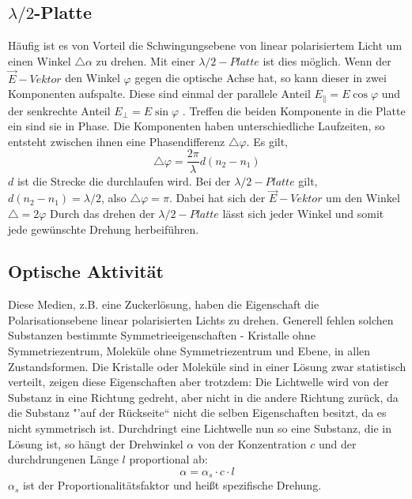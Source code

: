\subsection{$ \lambda/2 $-Platte}
Häufig ist es von Vorteil die Schwingungsebene von linear polarisiertem Licht um einen Winkel $ \bigtriangleup\alpha $ zu drehen. Mit einer $ \lambda/2-Platte $ ist dies möglich. Wenn der $ \vec{E}-Vektor $ den Winkel $ \varphi $ gegen die optische Achse hat, so kann dieser in zwei Komponenten aufspalte. Diese sind einmal der parallele Anteil $ E_{\|} = E\cos \varphi $ und der senkrechte Anteil $ E_{\bot}=E\sin \varphi $ . Treffen die beiden Komponente in die Platte ein sind sie in Phase. Die Komponenten haben unterschiedliche Laufzeiten, so entsteht zwischen ihnen eine Phasendifferenz $\bigtriangleup\varphi $. Es gilt, 
\begin{equation}
\bigtriangleup\varphi=\frac{2\pi}{\lambda}d(n_{2}-n_{1})
\end{equation}
$d$ ist die Strecke die durchlaufen wird. Bei der $ \lambda/2 - Platte $ gilt, $ d(n_{2}-n_{1})=\lambda/2 $, also $ \bigtriangleup\varphi=\pi $. Dabei hat sich der $ \vec{E}-Vektor $ um den Winkel $\bigtriangleup=2\varphi $ Durch das drehen der $ \lambda/2-Platte $ lässt sich jeder Winkel und somit jede gewünschte Drehung herbeiführen.
\subsection{Optische Aktivität}
Diese Medien, z.B. eine Zuckerlösung, haben die Eigenschaft die Polarisationsebene linear polarisierten Lichts zu drehen. Generell fehlen solchen Substanzen bestimmte Symmetrieeigenschaften - Kristalle ohne Symmetriezentrum, Moleküle ohne Symmetriezentrum und Ebene, in allen Zustandsformen. Die Kristalle oder Moleküle sind in einer Lösung zwar statistisch verteilt, zeigen diese Eigenschaften aber trotzdem: Die Lichtwelle wird von der Substanz in eine Richtung gedreht, aber nicht in die andere Richtung zurück, da die Substanz "'auf der Rückseite`` nicht die selben Eigenschaften besitzt, da es nicht symmetrisch ist. Durchdringt eine Lichtwelle nun so eine Substanz, die in Lösung ist, so hängt der Drehwinkel $\alpha$ von der Konzentration $c$ und der durchdrungenen Länge $l$ proportional ab:
\begin{equation}
\alpha = \alpha_{s}\cdot c\cdot l
\end{equation}
$\alpha_{s}$ ist der Proportionalitätsfaktor und heißt spezifische Drehung.